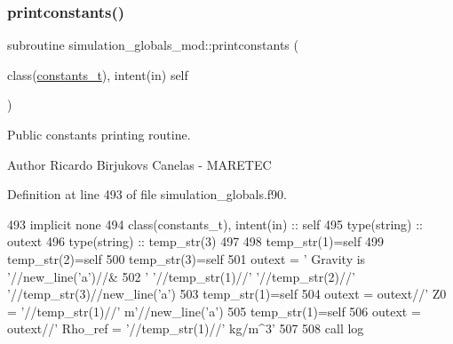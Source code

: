 \subsubsection{\texorpdfstring{printconstants()}{printconstants()}}
{\footnotesize\ttfamily subroutine simulation\+\_\+globals\+\_\+mod\+::printconstants (\begin{DoxyParamCaption}\item[{class(\mbox{\hyperlink{structsimulation__globals__mod_1_1constants__t}{constants\+\_\+t}}), intent(in)}]{self }\end{DoxyParamCaption})\hspace{0.3cm}{\ttfamily [private]}}



Public constants printing routine. 

\begin{DoxyAuthor}{Author}
Ricardo Birjukovs Canelas -\/ M\+A\+R\+E\+T\+EC 
\end{DoxyAuthor}


Definition at line 493 of file simulation\+\_\+globals.\+f90.


\begin{DoxyCode}
493     \textcolor{keywordtype}{implicit none}
494     \textcolor{keywordtype}{class}(constants\_t), \textcolor{keywordtype}{intent(in)} :: self
495     \textcolor{keywordtype}{type}(string) :: outext
496     \textcolor{keywordtype}{type}(string) :: temp\_str(3)
497 
498     temp\_str(1)=self%
499     temp\_str(2)=self%
500     temp\_str(3)=self%
501     outext = \textcolor{stringliteral}{'      Gravity is '}//new\_line(\textcolor{stringliteral}{'a'})//&
502         \textcolor{stringliteral}{'       '}//temp\_str(1)//\textcolor{stringliteral}{' '}//temp\_str(2)//\textcolor{stringliteral}{' '}//temp\_str(3)//new\_line(\textcolor{stringliteral}{'a'})
503     temp\_str(1)=self%
504     outext = outext//\textcolor{stringliteral}{'       Z0 = '}//temp\_str(1)//\textcolor{stringliteral}{' m'}//new\_line(\textcolor{stringliteral}{'a'})
505     temp\_str(1)=self%
506     outext = outext//\textcolor{stringliteral}{'       Rho\_ref = '}//temp\_str(1)//\textcolor{stringliteral}{' kg/m^3'}
507 
508     \textcolor{keyword}{call }log%
\end{DoxyCode}
\mbox{\label{namespacesimulation__globals__mod_ad331ccf019de7ed531e37c655600f90f}} 
